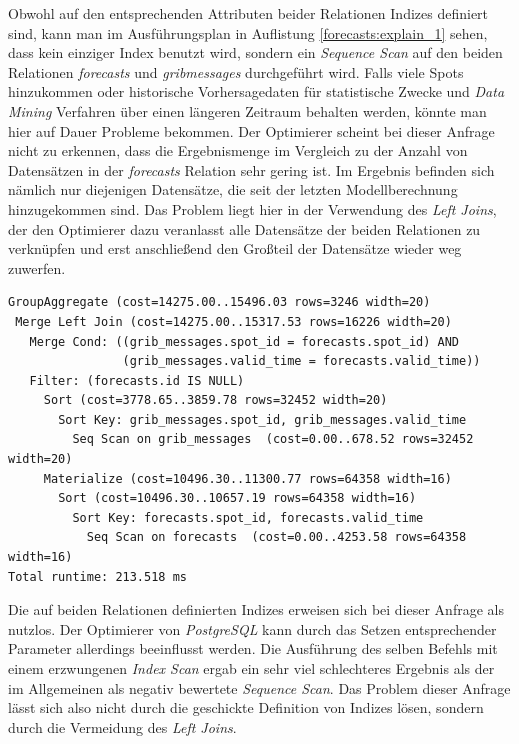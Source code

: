 Obwohl auf den entsprechenden Attributen beider Relationen Indizes
definiert sind, kann man im Ausführungsplan in Auflistung
\ref{forecasts:explain_1} sehen, dass kein einziger Index benutzt
wird, sondern ein \textit{Sequence Scan} auf den beiden Relationen
\textit{forecasts} und \textit{grib\textunderscore messages}
durchgeführt wird. Falls viele Spots hinzukommen oder historische
Vorhersagedaten für statistische Zwecke und \textit{Data Mining}
Verfahren über einen längeren Zeitraum behalten werden, könnte man
hier auf Dauer Probleme bekommen. Der Optimierer scheint bei dieser
Anfrage nicht zu erkennen, dass die Ergebnismenge im Vergleich zu der
Anzahl von Datensätzen in der \textit{forecasts} Relation sehr gering
ist. Im Ergebnis befinden sich nämlich nur diejenigen Datensätze, die
seit der letzten Modellberechnung hinzugekommen sind. Das Problem
liegt hier in der Verwendung des \textit{Left Joins}, der den
Optimierer dazu veranlasst alle Datensätze der beiden Relationen zu
verknüpfen und erst anschließend den Großteil der Datensätze wieder
weg zuwerfen.

\begin{lstlisting}[captionpos=b, caption=Ausführungsplan des Left Joins, label=forecasts:explain_1]
GroupAggregate (cost=14275.00..15496.03 rows=3246 width=20)
 Merge Left Join (cost=14275.00..15317.53 rows=16226 width=20)
   Merge Cond: ((grib_messages.spot_id = forecasts.spot_id) AND 
                (grib_messages.valid_time = forecasts.valid_time))
   Filter: (forecasts.id IS NULL)
     Sort (cost=3778.65..3859.78 rows=32452 width=20)
       Sort Key: grib_messages.spot_id, grib_messages.valid_time
         Seq Scan on grib_messages  (cost=0.00..678.52 rows=32452 width=20)
     Materialize (cost=10496.30..11300.77 rows=64358 width=16)
       Sort (cost=10496.30..10657.19 rows=64358 width=16)
         Sort Key: forecasts.spot_id, forecasts.valid_time
           Seq Scan on forecasts  (cost=0.00..4253.58 rows=64358 width=16)
Total runtime: 213.518 ms
\end{lstlisting}

Die auf beiden Relationen definierten Indizes erweisen sich bei dieser
Anfrage als nutzlos. Der Optimierer von \textit{PostgreSQL} kann durch
das Setzen entsprechender Parameter allerdings beeinflusst werden. Die
Ausführung des selben Befehls mit einem erzwungenen \textit{Index
  Scan} ergab ein sehr viel schlechteres Ergebnis als der im
Allgemeinen als negativ bewertete \textit{Sequence Scan}. Das Problem
dieser Anfrage lässt sich also nicht durch die geschickte Definition
von Indizes lösen, sondern durch die Vermeidung des \textit{Left
  Joins}.

